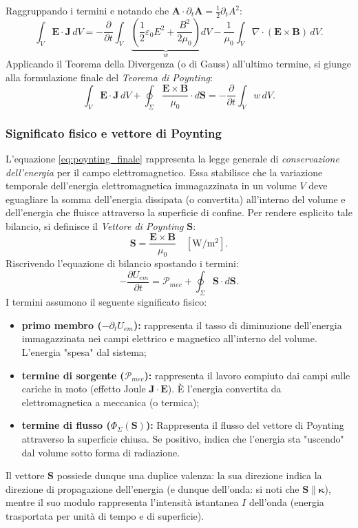 \documentclass[a4paper,11pt]{report}
\begin{document}
Raggruppando i termini e notando che $\bm{A} \cdot \partial_t \bm{A} = \frac{1}{2}\partial_t A^2$:
\begin{equation}
\int_V \bm{E} \cdot \bm{J} \, dV = - \frac{\partial}{\partial t} \int_V \underbrace{\left( \frac{1}{2}\varepsilon_0 E^2 + \frac{B^2}{2\mu_0} \right)}_{w} dV - \frac{1}{\mu_0} \int_V \nabla \cdot (\bm{E} \times \bm{B}) \, dV.
\end{equation}
Applicando il Teorema della Divergenza (o di Gauss) all'ultimo termine, si giunge alla formulazione finale del \textit{Teorema di Poynting}:
\begin{equation}
\int_V \bm{E} \cdot \bm{J} \, dV + \oint_{\Sigma} \frac{\bm{E} \times \bm{B}}{\mu_0} \cdot d\bm{S} = - \frac{\partial}{\partial t} \int_V w \, dV.
\label{eq:poynting_finale}
\end{equation}

\subsubsection{Significato fisico e vettore di Poynting}
L'equazione \eqref{eq:poynting_finale} rappresenta la legge generale di \textit{conservazione dell'energia} per il campo elettromagnetico. Essa stabilisce che la variazione temporale dell'energia elettromagnetica immagazzinata in un volume $V$ deve eguagliare la somma dell'energia dissipata (o convertita) all'interno del volume e dell'energia che fluisce attraverso la superficie di confine.
Per rendere esplicito tale bilancio, si definisce il \textit{Vettore di Poynting} $\bm{S}$:
\begin{equation}
\bm{S} = \frac{\bm{E} \times \bm{B}}{\mu_0} \quad \left[ \si{\watt\per\square\meter} \right].
\end{equation}
Riscrivendo l'equazione di bilancio spostando i termini:
\begin{equation}
-\frac{\partial U_{em}}{\partial t} = \mathcal{P}_{mec} + \oint_{\Sigma} \bm{S} \cdot d\bm{S}.
\end{equation}
I termini assumono il seguente significato fisico:
\begin{itemize}
    \item \textbf{primo membro ($-\partial_t U_{em}$):} rappresenta il tasso di diminuzione dell'energia immagazzinata nei campi elettrico e magnetico all'interno del volume. L'energia "spesa" dal sistema;
    \item \textbf{termine di sorgente ($\mathcal{P}_{mec}$):} rappresenta il lavoro compiuto dai campi sulle cariche in moto (effetto Joule $\bm{J} \cdot \bm{E}$). È l'energia convertita da elettromagnetica a meccanica (o termica);
    \item \textbf{termine di flusso ($\Phi_{\Sigma}(\bm{S})$):} Rappresenta il flusso del vettore di Poynting attraverso la superficie chiusa. Se positivo, indica che l'energia sta "uscendo" dal volume sotto forma di radiazione.
\end{itemize}
Il vettore $\bm{S}$ possiede dunque una duplice valenza: la sua direzione indica la direzione di propagazione dell'energia (e dunque dell'onda: si noti che $\bm{S} \parallel \bm{\kappa}$), mentre il suo modulo rappresenta l'intensità istantanea $I$ dell'onda (energia trasportata per unità di tempo e di superficie).
\end{document}
